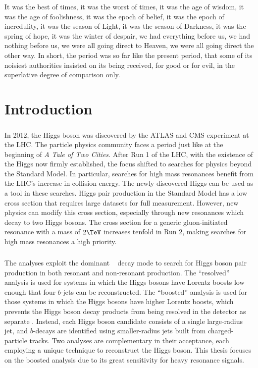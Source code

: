 \begin{savequote}[75mm]
It was the best of times, it was the worst of times, it was the age of wisdom, it was the age of foolishness, it was the epoch of belief, it was the epoch of incredulity, it was the season of Light, it was the season of Darkness, it was the spring of hope, it was the winter of despair, we had everything before us, we had nothing before us, we were all going direct to Heaven, we were all going direct the other way. In short, the period was so far like the present period, that some of its noisiest authorities insisted on its being received, for good or for evil, in the superlative degree of comparison only.
\end{savequote}

\chapter{Introduction}
\label{introduction}

\paragraph{}
In 2012, the Higgs boson was discovered by the ATLAS and CMS experiment at the LHC. The particle physics community faces a period just like at the beginning of \textit{A Tale of Two Cities}. 
After Run 1 of the LHC, with the existence of the Higgs now firmly established, the focus shifted to searches for physics beyond the Standard Model. 
In particular, searches for high mass resonances benefit from the LHC's increase in collision energy.  
The newly discovered Higgs can be used as a tool in these searches.
Higgs pair production in the Standard Model has a low cross section that requires large datasets for full measurement. 
However, new physics can modify this cross section, especially through new resonances which decay to two Higgs bosons.
The cross section for a generic gluon-initiated resonance with a mass of $2 \TeV$ increases tenfold in Run 2, making searches for high mass resonances a high priority.

\paragraph{}
The analyses exploit the dominant \hbb~ decay mode to search for Higgs boson pair production in both resonant and non-resonant production. 
The ``resolved'' analysis is used for \hh systems in which the Higgs bosons have Lorentz boosts low enough that four $b$-jets can be reconstructed. 
The ``boosted'' analysis is used for those \hh systems in which the Higgs bosons have higher Lorentz boosts, which prevents the Higgs boson decay products from being resolved in the detector as separate \bjets. 
Instead, each Higgs boson candidate consists of a single large-radius jet, and $b$-decays are identified using smaller-radius jets built from charged-particle tracks.
Two analyses are complementary in their acceptance, each employing a unique technique to reconstruct the Higgs boson.
This thesis focuses on the boosted analysis due to its great sensitivity for heavy resonance signals.

